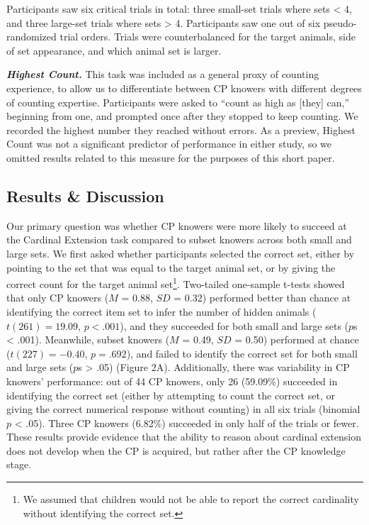 \documentclass[10pt, letterpaper]{article}
\begin{document}
Participants saw six critical trials in total: three small-set trials
where sets \textless{} 4, and three large-set trials where sets
\textgreater{} 4. Participants saw one out of six pseudo-randomized
trial orders. Trials were counterbalanced for the target animals, side
of set appearance, and which animal set is larger.

\vspace{10pt}

\noindent \textbf{\emph{Highest Count.}} This task was included as a
general proxy of counting experience, to allow us to differentiate
between CP knowers with different degrees of counting expertise.
Participants were asked to ``count as high as {[}they{]} can,''
beginning from one, and prompted once after they stopped to keep
counting. We recorded the highest number they reached without errors. As
a preview, Highest Count was not a significant predictor of performance
in either study, so we omitted results related to this measure for the
purposes of this short paper.

\hypertarget{results-discussion}{%
\subsection{Results \& Discussion}\label{results-discussion}}

Our primary question was whether CP knowers were more likely to succeed
at the Cardinal Extension task compared to subset knowers across both
small and large sets. We first asked whether participants selected the
correct set, either by pointing to the set that was equal to the target
animal set, or by giving the correct count for the target animal
set\footnote{We assumed that children would not be able to report the correct cardinality without identifying the correct set.}.
Two-tailed one-sample t-tests showed that only CP knowers (\(M\) = 0.88,
\(SD\) = 0.32) performed better than chance at identifying the correct
item set to infer the number of hidden animals (\(t(261) = 19.09\),
\(p < .001\)), and they succeeded for both small and large sets (\(p\)s
\textless{} .001). Meanwhile, subset knowers (\(M\) = 0.49, \(SD\) =
0.50) performed at chance (\(t(227) = -0.40\), \(p = .692\)), and failed
to identify the correct set for both small and large sets (\(p\)s
\textgreater{} .05) (Figure 2A). Additionally, there was variability in
CP knowers' performance: out of 44 CP knowers, only 26 (59.09\%)
succeeded in identifying the correct set (either by attempting to count
the correct set, or giving the correct numerical response without
counting) in all six trials (binomial \(p\) \textless{} .05). Three CP
knowers (6.82\%) succeeded in only half of the trials or fewer. These
results provide evidence that the ability to reason about cardinal
extension does not develop when the CP is acquired, but rather after the
CP knowledge stage.
\end{document}

